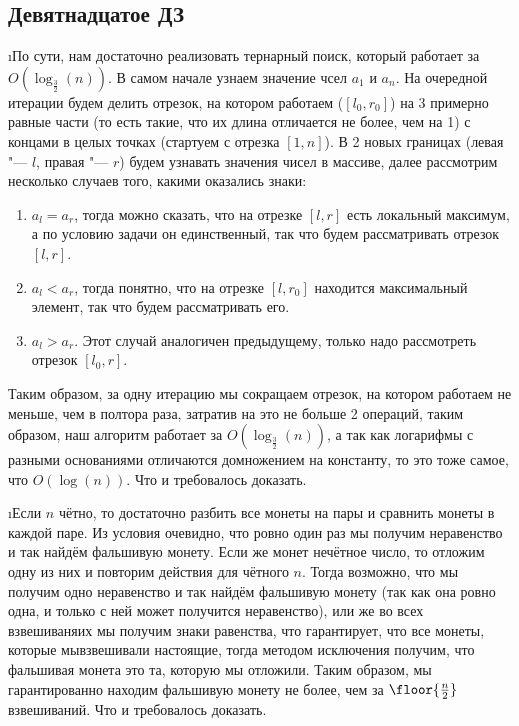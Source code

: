 \subsection{Девятнадцатое ДЗ}


\i По сути, нам достаточно реализовать тернарный поиск, который работает за $O(\log_{\frac{3}{2}}(n))$. В самом начале узнаем значение чсел $a_1$ и $a_n$. На очередной итерации будем делить отрезок, на котором работаем ($[l_0, r_0]$) на 3 примерно равные части (то есть такие, что их длина отличается не более, чем на 1) с концами в целых точках (стартуем с отрезка $[1, n]$). В 2 новых границах (левая "--- $l$, правая "--- $r$) будем узнавать значения чисел в массиве, далее рассмотрим несколько случаев того, какими оказались знаки:
\begin{enumerate}
    \item $a_l = a_r$, тогда можно сказать, что на отрезке $[l, r]$ есть локальный максимум, а по условию задачи он единственный, так что будем рассматривать отрезок $[l, r]$.
    \item $a_l < a_r$, тогда понятно, что на отрезке $[l, r_0]$ находится максимальный элемент, так что будем рассматривать его.
    \item $a_l > a_r$. Этот случай аналогичен предыдущему, только надо рассмотреть отрезок $[l_0, r]$.
\end{enumerate}
Таким образом, за одну итерацию мы сокращаем отрезок, на котором работаем не меньше, чем в полтора раза, затратив на это не больше 2 операций, таким образом, наш алгоритм работает за $O(\log_{\frac{3}{2}}(n))$, а так как логарифмы с разными основаниями отличаются домножением на константу, то это тоже самое, что $O(\log(n))$. Что и требовалось доказать.

\i Если $n$ чётно, то достаточно разбить все монеты на пары и сравнить монеты в каждой паре. Из условия очевидно, что ровно один раз мы получим неравенство и так найдём фальшивую монету. Если же монет нечётное число, то отложим одну из них и повторим действия для чётного $n$. Тогда возможно, что мы получим одно неравенство и так найдём фальшивую монету (так как она ровно одна, и только с ней может получится неравенство), или же во всех взвешиваняих мы получим знаки равенства, что гарантирует, что все монеты, которые мывзвешивали настоящие, тогда методом исключения получим, что фальшивая монета это та, которую мы отложили. Таким образом, мы гарантированно находим фальшивую монету не более, чем за $\floor{\frac{n}{2}}$ взвешиваний. Что и требовалось доказать.

